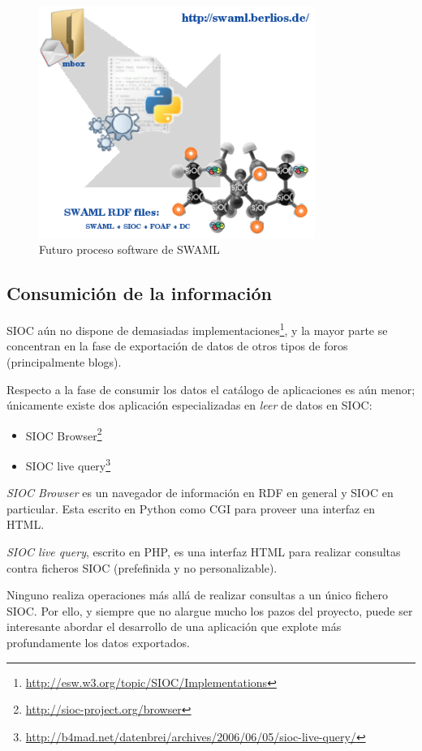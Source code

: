 \begin{figure}[H]
	\centering
	\includegraphics[width=9cm]{images/swaml-process.png}
	\caption{Futuro proceso software de SWAML}
	\label{fig:swamlProcess}
\end{figure}


\subsection{Consumición de la información}

SIOC aún no dispone de demasiadas implementaciones\footnote{\url{http://esw.w3.org/topic/SIOC/Implementations}},
y la mayor parte se concentran en la fase de exportación de datos de otros
tipos de foros (principalmente blogs). 

Respecto a la fase de consumir los datos el catálogo de aplicaciones es aún 
menor; únicamente existe dos aplicación especializadas en \emph{leer} de datos 
en SIOC:

\begin{itemize}
 \item SIOC Browser\footnote{\url{http://sioc-project.org/browser}}
 \item SIOC live query\footnote{\url{http://b4mad.net/datenbrei/archives/2006/06/05/sioc-live-query/}}
\end{itemize}

\emph{SIOC Browser} es un navegador de información en RDF en general y SIOC en 
particular. Esta escrito en Python como CGI para proveer una interfaz en HTML.

\emph{SIOC live query}, escrito en PHP, es una interfaz HTML para realizar consultas
contra ficheros SIOC (prefefinida y no personalizable).

Ninguno realiza operaciones más allá de realizar consultas a un único fichero 
SIOC. Por ello, y siempre que no alargue mucho los pazos del proyecto, puede ser 
interesante abordar el desarrollo de una aplicación que explote más profundamente
los datos exportados.
